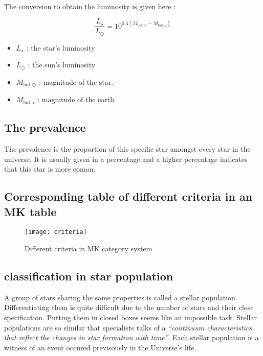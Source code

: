 \documentclass[a4paper, 11pt]{article} %
\begin{document}
\paragraph*{}
The conversion to obtain the luminosity is given here :
\begin{multicols}{2}

\begin{equation}
\frac{L_\star}{L_\odot} = 10^{0.4\left(M_\mathrm{bol,\odot} - M_\mathrm{bol,\star}\right)}
\end{equation}
\vspace{2cm}
\begin{itemize}
\item $L_\star$ : the star's luminosity
\item $L_\odot$ : the sun's luminosity
\item $M_\mathrm{bol,\odot}$ : magnitude of the star.
\item $M_\mathrm{bol,\star}$ : magnitude of the earth
\end{itemize}
\end{multicols}

\subsection{The prevalence}

The prevalence is the proportion of this specific star amongst every star in the universe. It is usually given in a percentage and a higher percentage indicates that this star is more comon.	

\subsection{Corresponding table of different criteria in an MK table}

\begin{figure}[h]
\centering
\texttt{[image: criteria]}
\caption{Different criteria in MK category system}
\end{figure}

\subsection{classification in star population}

A group of stars sharing the same properties is called a stellar population. 
Differentiating them is quite difficult due to the number of stars and their close specification. Putting them in closed boxes seems like an impossible task. Stellar populations are so similar that specialists talks of a \textit{``continuum characteristics that reflect the changes in star formation with time''}. Each stellar population is a witness of an event occured previsously in the Universe's life.
\end{document}
